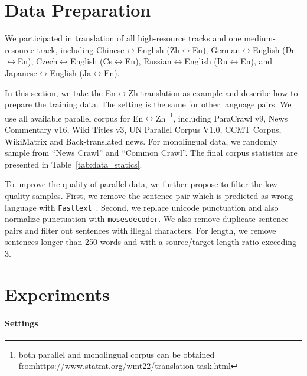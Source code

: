 \documentclass[11pt,a4paper]{article}
\begin{document}
\section{Data Preparation}
\label{sec:data}
We participated in translation of all high-resource tracks and one medium-resource track, including Chinese$\leftrightarrow$English (Zh$\leftrightarrow$En), German$\leftrightarrow$English (De$\leftrightarrow$En), Czech$\leftrightarrow$English (Cs$\leftrightarrow$En), Russian$\leftrightarrow$English (Ru$\leftrightarrow$En), and Japanese$\leftrightarrow$English (Ja$\leftrightarrow$En). 

In this section, we take the En$\leftrightarrow$Zh translation as example and describe how to prepare the training data. The setting is the same for other language pairs.
We use all available parallel corpus for En$\leftrightarrow$Zh~\footnote{both parallel and monolingual corpus can be obtained from\url{https://www.statmt.org/wmt22/translation-task.html}}, including ParaCrawl v9, News Commentary v16, Wiki Titles v3, UN Parallel Corpus V1.0, CCMT Corpus, WikiMatrix and Back-translated news. For monolingual data, we randomly sample from ``News Crawl'' and ``Common Crawl''. The final corpus statistics are presented in Table~\ref{tab:data_statics}.

To improve the quality of parallel data, we further propose to filter the low-quality samples.
First, we remove the sentence pair which is predicted as wrong language with  \texttt{Fasttext}~\cite{joulin-etal-2017-bag, joulin2016fasttext}. 
Second, we replace unicode punctuation and also normalize punctuation with \texttt{mosesdecoder}. 
We also remove duplicate sentence pairs and filter out sentences with illegal characters.
For length, we remove sentences longer than 250 words and with a source/target length ratio exceeding 3.


\section{Experiments}
\label{sec:exp}
\paragraph{Settings}
 
\end{document}
